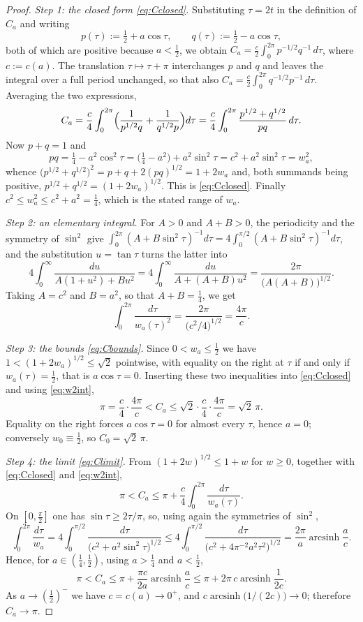 \documentclass[11pt,a4paper]{amsart}
\theoremstyle{plain}
\theoremstyle{definition}
\begin{document}
\begin{proof}
\emph{Step 1: the closed form \eqref{eq:Cclosed}.} Substituting $\tau=2t$ in the definition of $C_a$ and writing
\[
p(\tau):=\tfrac12+a\cos\tau,\qquad q(\tau):=\tfrac12-a\cos\tau,
\]
both of which are positive because $a<\tfrac12$, we obtain $C_a=\tfrac{c}{2}\int_0^{2\pi}p^{-1/2}q^{-1}\,d\tau$, where $c:=c(a)$. The translation $\tau\mapsto\tau+\pi$ interchanges $p$ and $q$ and leaves the integral over a full period unchanged, so that also $C_a=\tfrac{c}{2}\int_0^{2\pi}q^{-1/2}p^{-1}\,d\tau$. Averaging the two expressions,
\[
C_a=\frac{c}{4}\int_0^{2\pi}\Bigl(\frac{1}{p^{1/2}q}+\frac{1}{q^{1/2}p}\Bigr)d\tau
=\frac{c}{4}\int_0^{2\pi}\frac{p^{1/2}+q^{1/2}}{pq}\,d\tau .
\]
Now $p+q=1$ and
\[
pq=\tfrac14-a^2\cos^2\tau=\bigl(\tfrac14-a^2\bigr)+a^2\sin^2\tau=c^2+a^2\sin^2\tau=w_a^2 ,
\]
whence $\bigl(p^{1/2}+q^{1/2}\bigr)^2=p+q+2(pq)^{1/2}=1+2w_a$ and, both summands being positive, $p^{1/2}+q^{1/2}=(1+2w_a)^{1/2}$. This is \eqref{eq:Cclosed}. Finally $c^2\leq w_a^2\leq c^2+a^2=\tfrac14$, which is the stated range of $w_a$.

\emph{Step 2: an elementary integral.} For $A>0$ and $A+B>0$, the periodicity and the symmetry of $\sin^2$ give $\int_0^{2\pi}(A+B\sin^2\tau)^{-1}d\tau=4\int_0^{\pi/2}(A+B\sin^2\tau)^{-1}d\tau$, and the substitution $u=\tan\tau$ turns the latter into
\[
4\int_0^{\infty}\frac{du}{A(1+u^2)+Bu^2}=4\int_0^{\infty}\frac{du}{A+(A+B)u^2}=\frac{2\pi}{\bigl(A(A+B)\bigr)^{1/2}} .
\]
Taking $A=c^2$ and $B=a^2$, so that $A+B=\tfrac14$, we get
\begin{equation}\label{eq:w2int}
\int_0^{2\pi}\frac{d\tau}{w_a(\tau)^2}=\frac{2\pi}{\bigl(c^2/4\bigr)^{1/2}}=\frac{4\pi}{c} .
\end{equation}

\emph{Step 3: the bounds \eqref{eq:Cbounds}.} Since $0<w_a\leq\tfrac12$ we have $1<(1+2w_a)^{1/2}\leq\sqrt2$ pointwise, with equality on the right at $\tau$ if and only if $w_a(\tau)=\tfrac12$, that is $a\cos\tau=0$. Inserting these two inequalities into \eqref{eq:Cclosed} and using \eqref{eq:w2int},
\[
\pi=\frac{c}{4}\cdot\frac{4\pi}{c}<C_a\leq\sqrt2\cdot\frac{c}{4}\cdot\frac{4\pi}{c}=\sqrt2\,\pi .
\]
Equality on the right forces $a\cos\tau=0$ for almost every $\tau$, hence $a=0$; conversely $w_0\equiv\tfrac12$, so $C_0=\sqrt2\,\pi$.

\emph{Step 4: the limit \eqref{eq:Climit}.} From $(1+2w)^{1/2}\leq 1+w$ for $w\geq 0$, together with \eqref{eq:Cclosed} and \eqref{eq:w2int},
\[
\pi<C_a\leq\pi+\frac{c}{4}\int_0^{2\pi}\frac{d\tau}{w_a(\tau)} .
\]
On $[0,\tfrac\pi2]$ one has $\sin\tau\geq 2\tau/\pi$, so, using again the symmetries of $\sin^2$,
\[
\int_0^{2\pi}\frac{d\tau}{w_a}=4\int_0^{\pi/2}\frac{d\tau}{\bigl(c^2+a^2\sin^2\tau\bigr)^{1/2}}
\leq 4\int_0^{\pi/2}\frac{d\tau}{\bigl(c^2+4\pi^{-2}a^2\tau^2\bigr)^{1/2}}
=\frac{2\pi}{a}\operatorname{arcsinh}\frac{a}{c} .
\]
Hence, for $a\in(\tfrac14,\tfrac12)$, using $a>\tfrac14$ and $a<\tfrac12$,
\[
\pi<C_a\leq\pi+\frac{\pi c}{2a}\operatorname{arcsinh}\frac{a}{c}\leq\pi+2\pi\,c\operatorname{arcsinh}\frac{1}{2c} .
\]
As $a\to(\tfrac12)^-$ we have $c=c(a)\to 0^+$, and $c\operatorname{arcsinh}\bigl(1/(2c)\bigr)\to 0$; therefore $C_a\to\pi$.
\end{proof}
\end{document}
